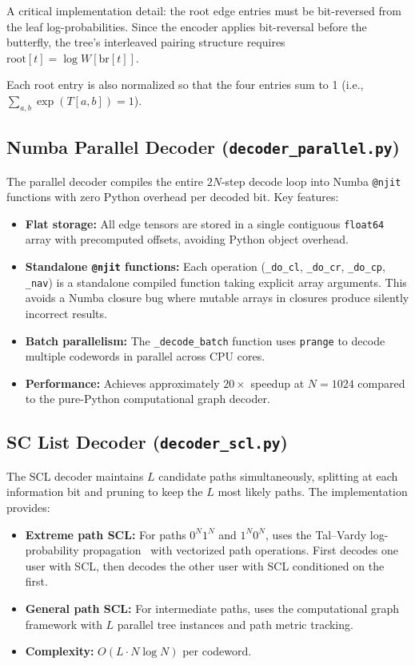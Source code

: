 \documentclass[11pt,a4paper]{article}
\begin{document}
A critical implementation detail: the root edge entries must be bit-reversed
from the leaf log-probabilities. Since the encoder applies bit-reversal
before the butterfly, the tree's interleaved pairing structure requires
$\text{root}[t] = \log W[\text{br}[t]]$.

Each root entry is also normalized so that the four entries sum to 1
(i.e., $\sum_{a,b} \exp(T[a,b]) = 1$).

\subsection{Numba Parallel Decoder (\texttt{decoder\_parallel.py})}

The parallel decoder compiles the entire $2N$-step decode loop into Numba
\texttt{@njit} functions with zero Python overhead per decoded bit. Key
features:

\begin{itemize}
  \item \textbf{Flat storage:} All edge tensors are stored in a single contiguous
        \texttt{float64} array with precomputed offsets, avoiding Python object
        overhead.
  \item \textbf{Standalone \texttt{@njit} functions:} Each operation
        (\texttt{\_do\_cl}, \texttt{\_do\_cr}, \texttt{\_do\_cp}, \texttt{\_nav})
        is a standalone compiled function taking explicit array arguments. This
        avoids a Numba closure bug where mutable arrays in closures produce
        silently incorrect results.
  \item \textbf{Batch parallelism:} The \texttt{\_decode\_batch} function uses
        \texttt{prange} to decode multiple codewords in parallel across CPU cores.
  \item \textbf{Performance:} Achieves approximately $20\times$ speedup at
        $N = 1024$ compared to the pure-Python computational graph decoder.
\end{itemize}

\subsection{SC List Decoder (\texttt{decoder\_scl.py})}

The SCL decoder maintains $L$ candidate paths simultaneously, splitting at
each information bit and pruning to keep the $L$ most likely paths. The
implementation provides:

\begin{itemize}
  \item \textbf{Extreme path SCL:} For paths $0^N 1^N$ and $1^N 0^N$, uses
        the Tal--Vardy log-probability propagation~\cite{talvardy2013} with
        vectorized path operations. First decodes one user with SCL, then
        decodes the other user with SCL conditioned on the first.
  \item \textbf{General path SCL:} For intermediate paths, uses the
        computational graph framework with $L$ parallel tree instances and
        path metric tracking.
  \item \textbf{Complexity:} $O(L \cdot N \log N)$ per codeword.
\end{itemize}
\end{document}
